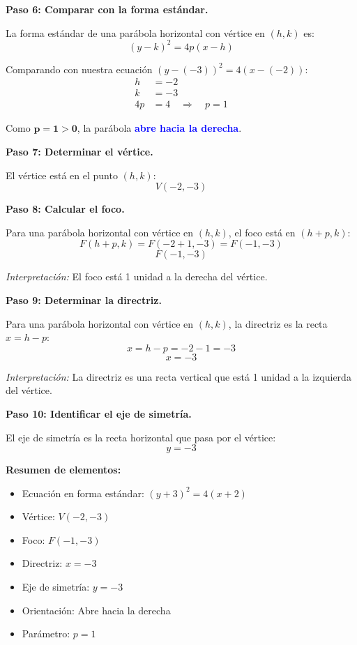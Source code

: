 \documentclass[12pt,a4paper]{article}
\begin{document}
	\textbf{Paso 6: Comparar con la forma estándar.}

	La forma estándar de una parábola horizontal con vértice en \((h,k)\) es:
	\[
	(y-k)^2=4p(x-h)
	\]

	Comparando con nuestra ecuación \((y-(-3))^2=4(x-(-2))\):
	\[
	\begin{aligned}
		h &= -2 \\
		k &= -3 \\
		4p &= 4 \quad\Rightarrow\quad p=1
	\end{aligned}
	\]

	Como \(\mathbf{p=1>0}\), la parábola \textcolor{blue}{\textbf{abre hacia la derecha}}.

	\bigskip

	\textbf{Paso 7: Determinar el vértice.}

	El vértice está en el punto \((h,k)\):
	\[
	\boxed{V(-2,-3)}
	\]

	\textbf{Paso 8: Calcular el foco.}

	Para una parábola horizontal con vértice en \((h,k)\), el foco está en \((h+p,k)\):
	\[
	F(h+p,k)=F(-2+1,-3)=F(-1,-3)
	\]
	\[
	\boxed{F(-1,-3)}
	\]

	\emph{Interpretación:} El foco está 1 unidad a la derecha del vértice.

	\bigskip

	\textbf{Paso 9: Determinar la directriz.}

	Para una parábola horizontal con vértice en \((h,k)\), la directriz es la recta \(x=h-p\):
	\[
	x=h-p=-2-1=-3
	\]
	\[
	\boxed{x=-3}
	\]

	\emph{Interpretación:} La directriz es una recta vertical que está 1 unidad a la izquierda del vértice.

	\bigskip

	\textbf{Paso 10: Identificar el eje de simetría.}

	El eje de simetría es la recta horizontal que pasa por el vértice:
	\[
	y=-3
	\]

	\bigskip

	\textbf{Resumen de elementos:}
	\begin{itemize}
		\item Ecuación en forma estándar: \((y+3)^2=4(x+2)\)
		\item Vértice: \(V(-2,-3)\)
		\item Foco: \(F(-1,-3)\)
		\item Directriz: \(x=-3\)
		\item Eje de simetría: \(y=-3\)
		\item Orientación: Abre hacia la derecha
		\item Parámetro: \(p=1\)
	\end{itemize}
\end{document}
